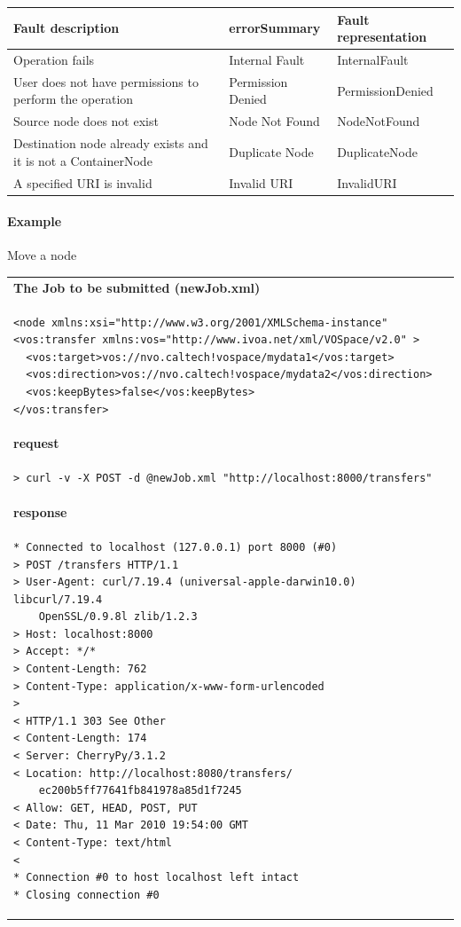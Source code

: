 \documentclass[11pt,a4paper]{ivoa}
\begin{document}
\vspace{3mm}
\begin{tabular}{ p{5cm} l p{4cm} }
\textbf{Fault description} & \textbf{errorSummary} & \textbf{Fault representation} \\
\hline
Operation fails & Internal Fault & InternalFault \\
\hline
User does not have permissions to perform the operation &Permission Denied & PermissionDenied \\
\hline
Source node does not exist & Node Not Found & NodeNotFound \\
\hline
Destination node already exists and it is not a ContainerNode & Duplicate Node & DuplicateNode \\
\hline
A specified URI is invalid & Invalid URI & InvalidURI \\
\hline
\end{tabular}
\vspace{3mm}

\paragraph{Example}
Move a node

\begin{tabular}{ p{10cm} }
\\
\textbf{The Job to be submitted (newJob.xml)} \\
\begin{lstlisting}
<node xmlns:xsi="http://www.w3.org/2001/XMLSchema-instance"
<vos:transfer xmlns:vos="http://www.ivoa.net/xml/VOSpace/v2.0" >
  <vos:target>vos://nvo.caltech!vospace/mydata1</vos:target>
  <vos:direction>vos://nvo.caltech!vospace/mydata2</vos:direction>
  <vos:keepBytes>false</vos:keepBytes>
</vos:transfer>
\end{lstlisting} \\
\textbf{request} \\
\begin{lstlisting}
> curl -v -X POST -d @newJob.xml "http://localhost:8000/transfers"
\end{lstlisting} \\
\textbf{response} \\
\begin{lstlisting}
* Connected to localhost (127.0.0.1) port 8000 (#0)
> POST /transfers HTTP/1.1
> User-Agent: curl/7.19.4 (universal-apple-darwin10.0) libcurl/7.19.4
    OpenSSL/0.9.8l zlib/1.2.3
> Host: localhost:8000
> Accept: */*
> Content-Length: 762
> Content-Type: application/x-www-form-urlencoded
> 
< HTTP/1.1 303 See Other
< Content-Length: 174
< Server: CherryPy/3.1.2
< Location: http://localhost:8080/transfers/
    ec200b5ff77641fb841978a85d1f7245
< Allow: GET, HEAD, POST, PUT
< Date: Thu, 11 Mar 2010 19:54:00 GMT
< Content-Type: text/html
< 
* Connection #0 to host localhost left intact
* Closing connection #0
\end{lstlisting} \\
\end{tabular}
\end{document}

